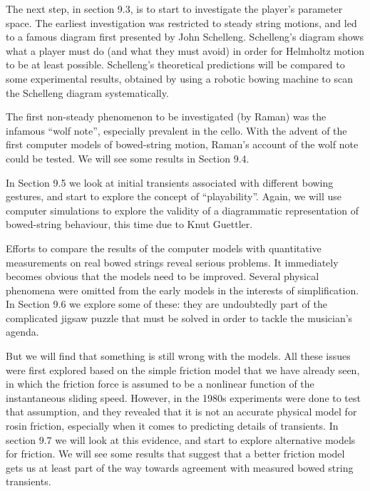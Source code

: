   The next step, in section 9.3, is to start to investigate the player’s 
  parameter space. The earliest investigation was restricted to steady string 
  motions, and led to a famous diagram first presented by John Schelleng. 
  Schelleng’s diagram shows what a player must do (and what they must avoid) in 
  order for Helmholtz motion to be at least possible. Schelleng’s theoretical 
  predictions will be compared to some experimental results, obtained by using 
  a robotic bowing machine to scan the Schelleng diagram systematically. 

  The first non-steady phenomenon to be investigated (by Raman) was the 
  infamous “wolf note”, especially prevalent in the cello. With the advent of 
  the first computer models of bowed-string motion, Raman’s account of the wolf 
  note could be tested. We will see some results in Section 9.4. 

  In Section 9.5 we look at initial transients associated with different bowing 
  gestures, and start to explore the concept of “playability”. Again, we will 
  use computer simulations to explore the validity of a diagrammatic 
  representation of bowed-string behaviour, this time due to Knut Guettler. 

  Efforts to compare the results of the computer models with quantitative 
  measurements on real bowed strings reveal serious problems. It immediately 
  becomes obvious that the models need to be improved. Several physical 
  phenomena were omitted from the early models in the interests of 
  simplification. In Section 9.6 we explore some of these: they are undoubtedly 
  part of the complicated jigsaw puzzle that must be solved in order to tackle 
  the musician's agenda. 

  But we will find that something is still wrong with the models. All these 
  issues were first explored based on the simple friction model that we have 
  already seen, in which the friction force is assumed to be a nonlinear 
  function of the instantaneous sliding speed. However, in the 1980s 
  experiments were done to test that assumption, and they revealed that it is 
  not an accurate physical model for rosin friction, especially when it comes 
  to predicting details of transients. In section 9.7 we will look at this 
  evidence, and start to explore alternative models for friction. We will see 
  some results that suggest that a better friction model gets us at least part 
  of the way towards agreement with measured bowed string transients. 



